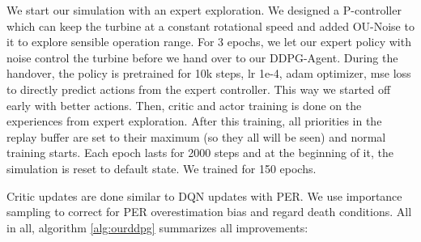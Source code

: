 \documentclass[hyperref,german,beleg]{cgvpub}
\begin{document}
We start our simulation with an expert exploration. We designed a P-controller which can keep the turbine at a constant rotational speed and added \ac{OU-Noise} to it to explore sensible operation range. For 3 epochs, we let our expert policy with noise control the turbine before we hand over to our \ac{DDPG}-Agent. During the handover, the policy is pretrained for 10k steps, lr 1e-4, adam optimizer, mse loss to directly predict actions from the expert controller. This way we started off early with better actions. Then, critic and actor training is done on the experiences from expert exploration. After this training, all priorities in the replay buffer are set to their maximum (so they all will be seen) and normal training starts. Each epoch lasts for 2000 steps and at the beginning of it, the simulation is reset to default state. We trained for 150 epochs.

Critic updates are done similar to \ac{DQN} updates with \ac{PER}. We use importance sampling to correct for \ac{PER} overestimation bias and regard death conditions. All in all, algorithm \ref{alg:ourddpg} summarizes all improvements:
\end{document}

